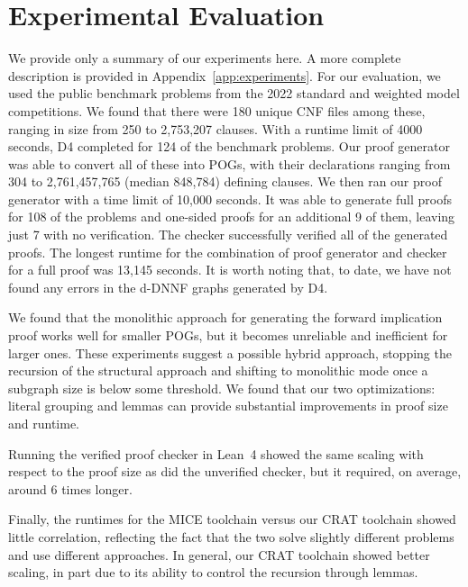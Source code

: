 \documentclass[letterpaper,USenglish,cleveref, autoref, thm-restate]{lipics-v2021}
\newcommand{\progname}[1]{\textsc{#1}}
\newcommand{\dfour}{\progname{D4}}
\newcommand{\lean}{Lean~4}
\begin{document}
\section{Experimental Evaluation}
\label{sect:experimental}

We provide only a summary of our experiments here.  A more complete
description is provided in Appendix~\ref{app:experiments}\@. For our
evaluation, we used the public benchmark problems from the 2022
standard and weighted model competitions.  We found that there were
180 unique CNF files among these, ranging in size from 250 to
2,753,207 clauses.
With a runtime limit of 4000 seconds, \dfour{} completed for 124 of the
benchmark problems.  Our proof generator was able to convert all of
these into POGs, with their declarations ranging from 304 to
2,761,457,765 (median 848,784) defining clauses.
We then ran our proof generator with a time limit of 10,000 seconds.
It was able to generate full proofs for 108 of the problems and
one-sided proofs for an additional 9 of them, leaving just 7 with no
verification.  The checker successfully verified all of the generated
proofs.  The longest runtime for the combination of proof generator
and checker for a full proof was 13,145 seconds.
It is worth noting that, to date, we have not found
any errors in the d-DNNF graphs generated by \dfour{}.

We found that the monolithic approach for generating the forward
implication proof works well for smaller POGs, but it becomes
unreliable and inefficient for larger ones.  These experiments suggest
a possible hybrid approach, stopping the recursion of the structural
approach and shifting to monolithic mode once a subgraph size is below some
threshold.  We found that our two optimizations: literal grouping and
lemmas can provide substantial improvements in proof size and runtime.

Running the verified proof checker in \lean{} showed the same scaling
with respect to the proof size as did the unverified checker, but it
required, on average, around 6 times longer.

Finally, the runtimes for the MICE toolchain versus our CRAT toolchain
showed little correlation, reflecting the fact that the two solve
slightly different problems and use different approaches.  In general,
our CRAT toolchain showed better scaling, in part due to its ability
to control the recursion through lemmas.
\end{document}
